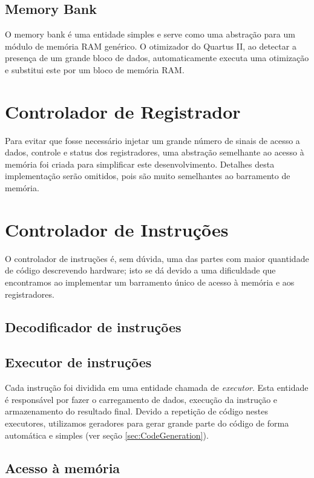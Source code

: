 \documentclass[11pt]{report}
\begin{document}
\subsection{Memory Bank}
\label{sec:MemoryBank}
O memory bank é uma entidade simples e serve como uma abstração para um módulo de memória RAM genérico. O otimizador do Quartus II, ao detectar a presença de um grande bloco de dados, automaticamente executa uma otimização e substitui este por um bloco de memória RAM.

\section{Controlador de Registrador}
Para evitar que fosse necessário injetar um grande número de sinais de acesso a dados, controle e status dos registradores, uma abstração semelhante ao acesso à memória foi criada para simplificar este desenvolvimento. Detalhes desta implementação serão omitidos, pois são muito semelhantes ao barramento de memória.

\section{Controlador de Instruções}
\label{sec:InstructionController}
O controlador de instruções é, sem dúvida, uma das partes com maior quantidade de código descrevendo hardware; isto se dá devido a uma dificuldade que encontramos ao implementar um barramento único de acesso à memória e aos registradores.

\subsection{Decodificador de instruções}

\subsection{Executor de instruções}
\label{sec:InstructionExecutor}
Cada instrução foi dividida em uma entidade chamada de \emph{executor}. Esta entidade é responsável por fazer o carregamento de dados, execução da instrução e armazenamento do resultado final. Devido a repetição de código nestes executores, utilizamos geradores para gerar grande parte do código de forma automática e simples (ver seção \ref{sec:CodeGeneration}).

\subsection{Acesso à memória}
\label{sec:MemoryAccess}
\end{document}
